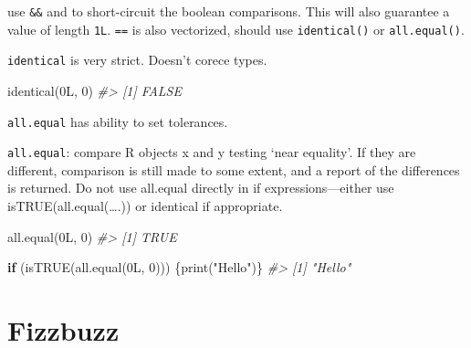 \documentclass[
]{book}
\newenvironment{Shaded}{\begin{snugshade}}{\end{snugshade}}
\newcommand{\CommentTok}[1]{\textcolor[rgb]{0.56,0.35,0.01}{\textit{#1}}}
\newcommand{\ControlFlowTok}[1]{\textcolor[rgb]{0.13,0.29,0.53}{\textbf{#1}}}
\newcommand{\DecValTok}[1]{\textcolor[rgb]{0.00,0.00,0.81}{#1}}
\newcommand{\FunctionTok}[1]{\textcolor[rgb]{0.00,0.00,0.00}{#1}}
\newcommand{\NormalTok}[1]{#1}
\newcommand{\StringTok}[1]{\textcolor[rgb]{0.31,0.60,0.02}{#1}}
\begin{document}
use \texttt{\&\&} and \texttt{\textbar{}\textbar{}} to short-circuit the boolean comparisons.
This will also guarantee a value of length \texttt{1L}.
\texttt{==} is also vectorized, should use \texttt{identical()} or \texttt{all.equal()}.

\texttt{identical} is very strict. Doesn't corece types.

\begin{Shaded}
\begin{Highlighting}[]
\FunctionTok{identical}\NormalTok{(0L, }\DecValTok{0}\NormalTok{)}
\CommentTok{\#\textgreater{} [1] FALSE}
\end{Highlighting}
\end{Shaded}

\texttt{all.equal} has ability to set tolerances.

\texttt{all.equal}: compare R objects x and y testing `near equality'. If they are different, comparison is still made to some extent, and a report of the differences is returned. Do not use all.equal directly in if expressions---either use isTRUE(all.equal(\ldots.)) or identical if appropriate.

\begin{Shaded}
\begin{Highlighting}[]
\FunctionTok{all.equal}\NormalTok{(0L, }\DecValTok{0}\NormalTok{)}
\CommentTok{\#\textgreater{} [1] TRUE}
\end{Highlighting}
\end{Shaded}

\begin{Shaded}
\begin{Highlighting}[]
\ControlFlowTok{if}\NormalTok{ (}\FunctionTok{isTRUE}\NormalTok{(}\FunctionTok{all.equal}\NormalTok{(0L, }\DecValTok{0}\NormalTok{))) \{}\FunctionTok{print}\NormalTok{(}\StringTok{"Hello"}\NormalTok{)\}}
\CommentTok{\#\textgreater{} [1] "Hello"}
\end{Highlighting}
\end{Shaded}

\hypertarget{fizzbuzz}{%
\section{Fizzbuzz}\label{fizzbuzz}}
\end{document}
